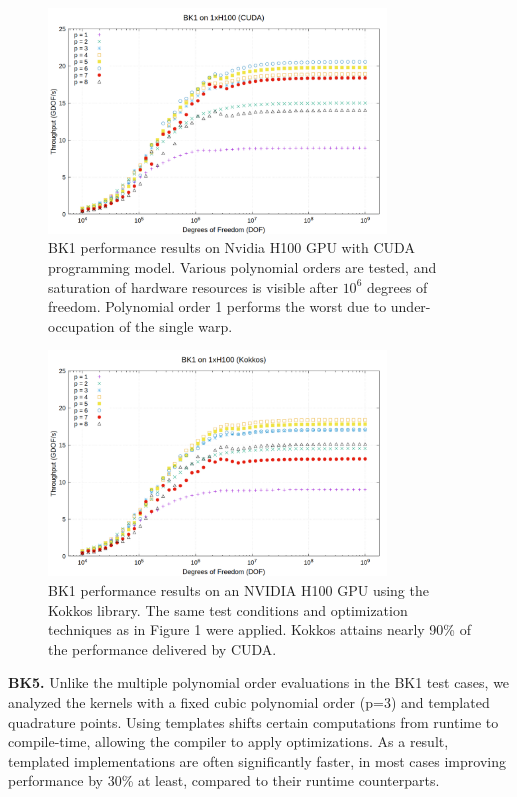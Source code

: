 \documentclass[a4paper,12pt]{article}
\begin{document}
\begin{figure}
\centering
\includegraphics[width=0.8\textwidth]{BK1_1}
\caption{BK1 performance results on Nvidia H100 GPU with CUDA programming model. Various polynomial orders are tested, and saturation of hardware resources is visible after $10^6$ degrees of freedom. Polynomial order 1 performs the worst due to under-occupation of the single warp.}
\label{fig:BK1_1}
\end{figure}
\begin{figure}
\centering
\includegraphics[width=0.8\textwidth]{BK1_2}
\caption{BK1 performance results on an NVIDIA H100 GPU using the Kokkos library. The same test conditions and optimization techniques as in Figure 1 were applied. Kokkos attains nearly 90\% of the performance delivered by CUDA.}
\label{fig:BK1_2}
\end{figure}

{\bf BK5.} Unlike the multiple polynomial order evaluations in the BK1 test cases, we analyzed the kernels with a fixed cubic polynomial order (p=3) and templated quadrature points. Using templates shifts certain computations from runtime to compile-time, allowing the compiler to apply optimizations. As a result, templated implementations are often significantly faster, in most cases improving performance by 30\% at least, compared to their runtime counterparts.
\end{document}
